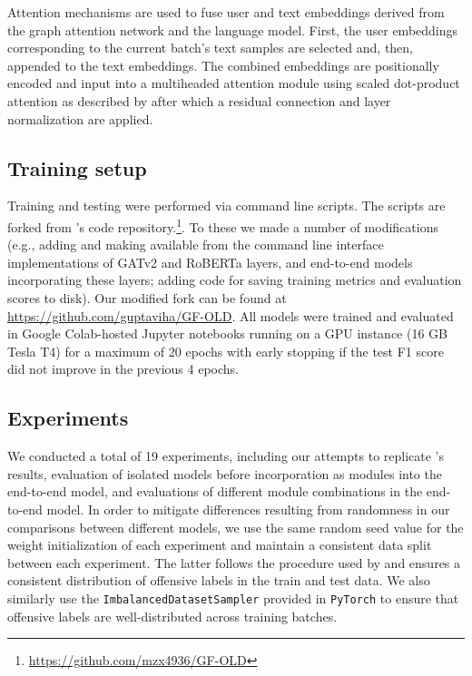 \documentclass[letterpaper]{article} %
\begin{document}
Attention mechanisms are used to fuse user and text embeddings derived from the graph attention network and the language model. First, the user embeddings corresponding to the current batch's text samples are selected and, then, appended to the text embeddings. The combined embeddings are positionally encoded and input into a multiheaded attention module using scaled dot-product attention as described by \citet{Vaswani2017} after which a residual connection and layer normalization are applied.

\subsection{Training setup}

Training and testing were performed via command line scripts. The scripts are forked from \citet{Miao2022}'s code repository.\footnote{\url{https://github.com/mzx4936/GF-OLD}}. To these we made a number of modifications (e.g., adding and making available from the command line interface implementations of GATv2 and RoBERTa layers, and end-to-end models incorporating these layers; adding code for saving training metrics and evaluation scores to disk). Our modified fork can be found at \url{https://github.com/guptaviha/GF-OLD}. All models were trained and evaluated in Google Colab-hosted Jupyter notebooks running on a GPU instance (16 GB Tesla T4) for a maximum of 20 epochs with early stopping if the test F1 score did not improve in the previous 4 epochs.

\subsection{Experiments}

We conducted a total of 19 experiments, including our attempts to replicate \citet{Miao2022}'s results, evaluation of isolated models before incorporation as modules into the end-to-end model, and evaluations of different module combinations in the end-to-end model. In order to mitigate differences resulting from randomness in our comparisons between different models, we use the same random seed value for the weight initialization of each experiment and maintain a consistent data split between each experiment. The latter follows the procedure used by \citet{Miao2022} and ensures a consistent distribution of offensive labels in the train and test data. We also similarly use the \verb|ImbalancedDatasetSampler| provided in \verb|PyTorch| to ensure that offensive labels are well-distributed across training batches. 
\end{document}
